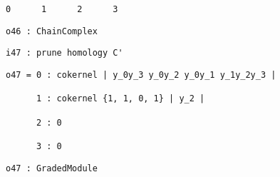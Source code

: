 \documentclass[12pt,leqno]{amsart}
\theoremstyle{definition}
\begin{document}
\begin{lstlisting}[xleftmargin=10pt, aboveskip=1.5pt, belowskip=1.5pt]
      0      1      2      3
\end{lstlisting}
\begin{lstlisting}[xleftmargin=10pt, aboveskip=1.5pt, belowskip=1.5pt] 
o46 : ChainComplex
\end{lstlisting}
\vfill
\begin{lstlisting}[xleftmargin=10pt, aboveskip=1.5pt, belowskip=1.5pt] 
i47 : prune homology C'
\end{lstlisting}
\begin{lstlisting}[xleftmargin=10pt, lineskip=-10pt, aboveskip=1.5pt, belowskip=1.5pt]
o47 = 0 : cokernel | y_0y_3 y_0y_2 y_0y_1 y_1y_2y_3 |

      1 : cokernel {1, 1, 0, 1} | y_2 |              

      2 : 0                                          

      3 : 0   
\end{lstlisting}
\begin{lstlisting}[xleftmargin=10pt, aboveskip=1.5pt, belowskip=3.0pt]
o47 : GradedModule
\end{lstlisting}
\end{document}
